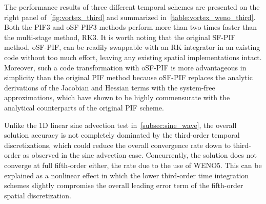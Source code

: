 The performance results of three different temporal schemes are presented
on the right panel of~\cref{fig:vortex_third} and summarized in~\cref{table:vortex_weno_third}.
Both the PIF3 and oSF-PIF3 methods perform more than two times faster than the multi-stage method, RK3.
It is worth noting that the original SF-PIF method, oSF-PIF, can be readily swappable
with an RK integrator in an existing code without too much effort,
leaving any existing spatial implementations intact.
Moreover, such a code transformation with oSF-PIF is more advantageous in simplicity
than the original PIF method because oSF-PIF replaces the analytic derivations of the Jacobian and Hessian terms
with the system-free approximations,
which have shown to be highly commensurate with
the analytical counterparts of the original PIF scheme.

Unlike the 1D linear sine advection test in~\cref{subsec:sine_wave},
the overall solution accuracy is not completely dominated by the third-order temporal discretizations,
which could reduce the overall convergence rate down to third-order as observed in the sine advection case.
Concurrently, the solution does not converge at full fifth-order either,
the rate due to the use of WENO5.
This can be explained as a nonlinear effect in which the lower third-order time integration schemes
slightly compromise the overall leading error term of the fifth-order spatial discretization.

